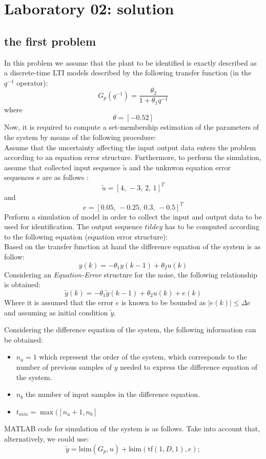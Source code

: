 \chapter{Laboratory 02: solution}
\section{the first problem}
In this problem we assume that the plant to be identified is exactly described as a discrete-time
LTI models described by the following transfer function (in the \(q^{-1}\) operator):
\[
G_p(q^{-1}) = \frac {\theta_2}{1 + \theta_1q^{-1}}
\]
where
\[
\theta = \left[-0.5 2 \right]
\]
Now, it is required to compute a set-membership estimation of the parameters of the system by means of the following procedure:\\
Assume that the uncertainty affecting the input output data enters the problem according to an equation error structure. Furthermore, to perform the simulation, assume that collected input sequence \(\tilde{u}\) and the unknwon equation error sequences e are as follows :
\[
\tilde{u} = \left[4,\,-3,\,2,\, 1 \right]^T
\]
and
\[
e = \left[0.05,\,-0.25,\,0.3,\,-0.5 \right]^T
\]
Perform a simulation of model in order to collect the input and output data to be used for identification. The output sequence \(tilde{y}\) has to be computed according to the following equation (equation error structure):\\
Based on the transfer function at hand the difference equation of the system is as follow:
\[
y(k) = -\theta_1y(k-1) + \theta_2u(k)
\]
Considering an \textit{Equation-Error} structure for the noise, the following relationship is obtained:
\[
\tilde{y}(k) = -\theta_1 \tilde{y}(k-1) + \theta_2u(k) + e(k)
\]
Where it is assumed that the error \(e\) is known to be bounded as \(|e(k)|\leq \Delta e\) and assuming as initial condition \(\tilde{y}\).

Considering the difference equation of the system, the following information can be obtained:\\
\begin{itemize}
\item \(n_a = 1\) which represent the order of the system, which corresponds to the number of previous samples of \(y\) needed to express the difference equation of the system.
\item \(n_b\) the number of input samples in the difference equation.
\item \(t_{min} = \max(\left[n_a +1, n_b\right]\)
\end{itemize}
MATLAB code for simulation of the system is as follows. Take into account that, alternatively, we could use:
\[
\tilde{y} = \text{lsim}(G_p,u) + \text{lsim}(\text{tf}(1,D,1),e);
\]

